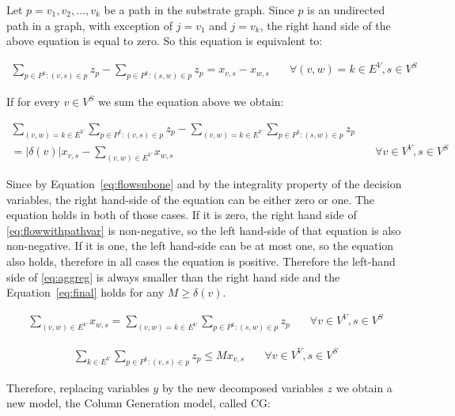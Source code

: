 Let $p = v_{1},v_{2},\ldots,v_{k}$ be a path in the substrate graph. Since $p$
is an undirected path in a graph, with exception of $j = v_{1}$ and $ j = v_{k}$,
the right hand side of the above equation is equal 
to zero. So this equation is equivalent to:

\begin{align}
  \sum\limits_{p \in P^k : (v,s) \in p} z_{p}
    - \sum\limits_{p \in P^k : (s,w) \in p} z_{p} 
    = x_{v,s} - x_{w,s}   
    & \quad \forall (v,w) = k \in E^{V}, s \in V^{S} \nonumber %
\end{align}

If for every $v \in V^S$ we sum the equation above we obtain:

\begin{align}
  \sum\limits_{(v,w) = k \in E^{V}}\sum\limits_{p \in P^k : (v,s) \in p} z_{p}
    - \sum\limits_{(v,w) = k \in E^V}\sum\limits_{p \in P^k : (s,w) \in p} z_{p} & \nonumber \\
    = |\delta(v)| x_{v,s} - \sum\limits_{(v,w) \in E^{V}} x_{w,s}       & \quad \forall v \in V^{V}, s \in V^{S} \label{eq:aggreg}
\end{align}

Since by Equation~\ref{eq:flowsubone} and by the integrality property of the decision variables, the right
hand-side of the equation can be either zero or one. The equation holds in both of those cases.
If it is zero, the right hand side of \eqref{eq:flowwithpathvar} is non-negative, so
the left hand-side of that equation is also non-negative. If it is one, the left hand-side
can be at most one, so the equation also holds, therefore in all cases the equation is positive.
Therefore the left-hand side of \eqref{eq:aggreg} is always smaller than the right hand side and the 
Equation~\eqref{eq:final} holds for any $M \geq \delta(v)$.


\begin{align}
    \sum\limits_{(v,w) \in E^{V}} x_{w,s} = 
    \sum\limits_{(v,w) = k \in E^{V}}\sum\limits_{p \in P^k : (s,w) \in p} z_{p} & \quad \forall v \in V^{V}, s \in V^{S}
\end{align}

\begin{align}
  \sum\limits_{k \in E^{V}}\sum\limits_{p \in P^k : (v,s) \in p} z_{p} \leq M x_{v,s}       & \quad \forall v \in V^{V}, s \in V^{S}
  \label{eq:final}
\end{align}

Therefore, replacing variables $y$ by the new decomposed variables $z$ we obtain a new model, the Column Generation model, called CG:

